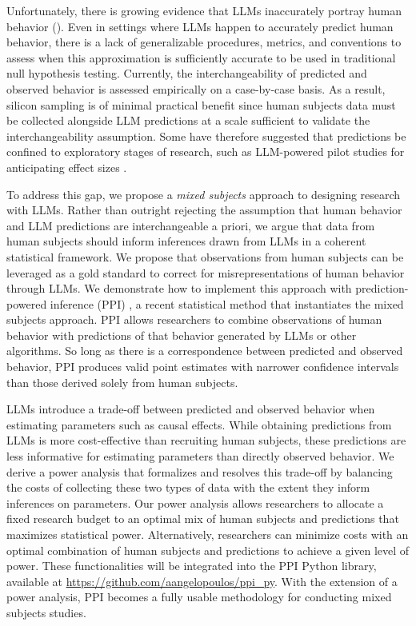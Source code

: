 \documentclass{article}
\begin{document}
Unfortunately, there is growing evidence that LLMs inaccurately portray human behavior (\citealp{Bisbee2024synthetic, park2024diminished, takemoto_moral_2024, abdurahman2024perils}). Even in settings where LLMs happen to accurately predict human behavior, there is a lack of generalizable procedures, metrics, and conventions to assess when this approximation is sufficiently accurate to be used in traditional null hypothesis testing. Currently, the interchangeability of predicted and observed behavior is assessed empirically on a case-by-case basis. As a result, silicon sampling is of minimal practical benefit since human subjects data must be collected alongside LLM predictions at a scale sufficient to validate the interchangeability assumption. Some have therefore suggested that predictions be confined to exploratory stages of research, such as LLM-powered pilot studies for anticipating effect sizes \citep{grossmann_ai_2023,ashokkumar_predicting_2024}.

To address this gap, we propose a \textit{mixed subjects} approach to designing research with LLMs. Rather than outright rejecting the assumption that human behavior and LLM predictions are interchangeable a priori, we argue that data from human subjects should inform inferences drawn from LLMs in a coherent statistical framework. We propose that observations from human subjects can be leveraged as a gold standard to correct for misrepresentations of human behavior through LLMs. We demonstrate how to implement this approach with prediction-powered inference (PPI) \citep{angelopoulos_prediction-powered_2023-1, angelopoulos2024ppi}, a recent statistical method that instantiates the mixed subjects approach. PPI allows researchers to combine observations of human behavior with predictions of that behavior generated by LLMs or other algorithms. So long as there is a correspondence between predicted and observed behavior, PPI produces valid point estimates with narrower confidence intervals than those derived solely from human subjects.

LLMs introduce a trade-off between predicted and observed behavior when estimating parameters such as causal effects. While obtaining predictions from LLMs is more cost-effective than recruiting human subjects, these predictions are less informative for estimating parameters than directly observed behavior. We derive a power analysis that formalizes and resolves this trade-off by balancing the costs of collecting these two types of data with the extent they inform inferences on parameters. Our power analysis allows researchers to allocate a fixed research budget to an optimal mix of human subjects and predictions that maximizes statistical power. Alternatively, researchers can minimize costs with an optimal combination of human subjects and predictions to achieve a given level of power. These functionalities will be integrated into the PPI Python library, available at \href{https://github.com/aangelopoulos/ppi_py}{https://github.com/aangelopoulos/ppi\_py}. With the extension of a power analysis, PPI becomes a fully usable methodology for conducting mixed subjects studies. 
\end{document}

